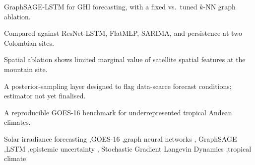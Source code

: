 \documentclass[a4paper,fleqn]{cas-sc}
\begin{document}
\begin{abstract}
horizons, while absolute skill is markedly lower at the mountain site,
indicating that model selection should be climate-aware. There, a
spatial-ablation baseline discarding all within-patch structure proves
surprisingly competitive, quantifying how little of the achievable skill is
attributable to spatial encoding. The weighted-graph ablation and the
uncertainty decomposition remain in progress: the epistemic estimator is not
yet finalised, as a fixed-step SGLD chain drifts over the full sampling
budget on these over-parameterised networks. This work contributes a
reproducible GOES-16 benchmark for the underrepresented tropical Andean
climate and a posterior-sampling approach to epistemic uncertainty
quantification for satellite-based solar forecasting.
\end{abstract}

\begin{highlights}
\item GraphSAGE-LSTM for GHI forecasting, with a fixed vs.\ tuned $k$-NN
      graph ablation.
\item Compared against ResNet-LSTM, FlatMLP, SARIMA, and persistence at two
      Colombian sites.
\item Spatial ablation shows limited marginal value of satellite spatial
      features at the mountain site.
\item A posterior-sampling layer designed to flag data-scarce forecast
      conditions; estimator not yet finalised.
\item A reproducible GOES-16 benchmark for underrepresented tropical Andean
      climates.
\end{highlights}

\begin{keywords}
Solar irradiance forecasting \sep GOES-16 \sep graph neural networks \sep
GraphSAGE \sep LSTM \sep epistemic uncertainty \sep
Stochastic Gradient Langevin Dynamics \sep tropical climate
\end{keywords}

\maketitle

\linenumbers







\end{document}
